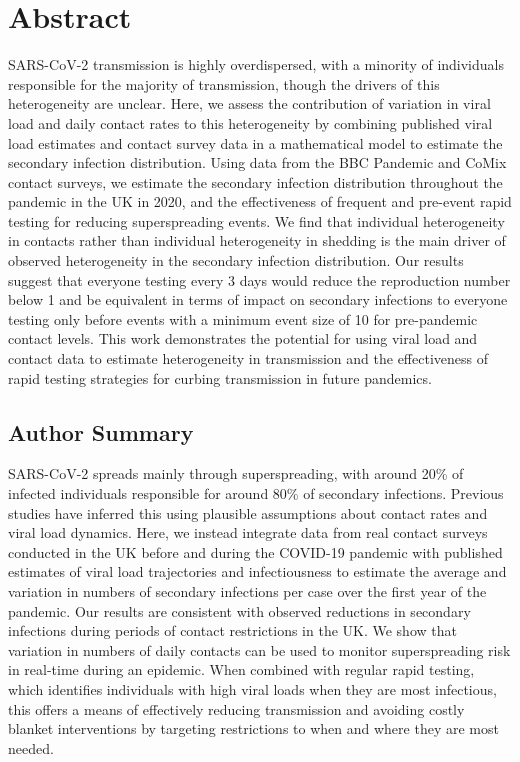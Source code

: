 \documentclass[
  10pt,
  letterpaper,
]{article}
\begin{document}
\section*{Abstract}
SARS-CoV-2 transmission is highly overdispersed, with a minority of
individuals responsible for the majority of transmission, though the
drivers of this heterogeneity are unclear. Here, we assess the
contribution of variation in viral load and daily contact rates to this
heterogeneity by combining published viral load estimates and contact
survey data in a mathematical model to estimate the secondary infection
distribution. Using data from the BBC Pandemic and CoMix contact
surveys, we estimate the secondary infection distribution throughout the
pandemic in the UK in 2020, and the effectiveness of frequent and
pre-event rapid testing for reducing superspreading events. We find that
individual heterogeneity in contacts rather than individual
heterogeneity in shedding is the main driver of observed heterogeneity
in the secondary infection distribution. Our results suggest that
everyone testing every 3 days would reduce the reproduction number below
1 and be equivalent in terms of impact on secondary infections to
everyone testing only before events with a minimum event size of 10 for
pre-pandemic contact levels. This work demonstrates the potential for
using viral load and contact data to estimate heterogeneity in
transmission and the effectiveness of rapid testing strategies for
curbing transmission in future pandemics.


\linenumbers

\subsection{Author Summary}\label{author-summary}

SARS-CoV-2 spreads mainly through superspreading, with around 20\% of
infected individuals responsible for around 80\% of secondary
infections. Previous studies have inferred this using plausible
assumptions about contact rates and viral load dynamics. Here, we
instead integrate data from real contact surveys conducted in the UK
before and during the COVID-19 pandemic with published estimates of
viral load trajectories and infectiousness to estimate the average and
variation in numbers of secondary infections per case over the first
year of the pandemic. Our results are consistent with observed
reductions in secondary infections during periods of contact
restrictions in the UK. We show that variation in numbers of daily
contacts can be used to monitor superspreading risk in real-time during
an epidemic. When combined with regular rapid testing, which identifies
individuals with high viral loads when they are most infectious, this
offers a means of effectively reducing transmission and avoiding costly
blanket interventions by targeting restrictions to when and where they
are most needed.
\end{document}

